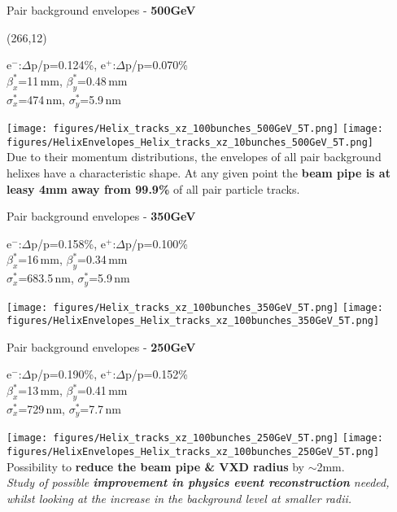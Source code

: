 \documentclass[xcolor={dvipsnames}]{beamer}
\newcommand{\proceedigHelix}{
  \setlength{\TPHorizModule}{1pt}
  \setlength{\TPVertModule}{1pt}
  \begin{textblock}{55}(266,12)
  \centering
  \textblockcolour{SpringGreen}
  \vspace*{0.8mm}{arXiv:\\1703.05737}\vspace*{0.8mm}
  \end{textblock}
}
\newcommand{\electron}{e$^-$}
\newcommand{\positron}{e$^+$}
\begin{document}
\begin{frame}{Pair background envelopes - \textbf{500GeV}}
\proceedigHelix
\begin{center}
\small
\electron:$\Delta$p/p=0.124\%, \positron:$\Delta$p/p=0.070\%\\
$\beta^*_x$=11\,mm, $\beta^*_y$=0.48\,mm\\
$\sigma^*_x$=474\,nm, $\sigma^*_y$=5.9\,nm
\end{center}
\texttt{[image: figures/Helix\_tracks\_xz\_100bunches\_500GeV\_5T.png]}\hspace*{0.1cm}
   \texttt{[image: figures/HelixEnvelopes\_Helix\_tracks\_xz\_10bunches\_500GeV\_5T.png]}\\
Due to their momentum distributions, the envelopes of all pair background helixes have a characteristic shape.
At any given point the \textbf{beam pipe is at leasy 4mm away from 99.9\%} of all pair particle tracks.
\end{frame}
\begin{frame}{Pair background envelopes - \textbf{350GeV}}
\begin{center}
\small
\electron:$\Delta$p/p=0.158\%, \positron:$\Delta$p/p=0.100\%\\
$\beta^*_x$=16\,mm, $\beta^*_y$=0.34\,mm\\
$\sigma^*_x$=683.5\,nm, $\sigma^*_y$=5.9\,nm
\end{center}
   \texttt{[image: figures/Helix\_tracks\_xz\_100bunches\_350GeV\_5T.png]}\hspace*{0.1cm}
   \texttt{[image: figures/HelixEnvelopes\_Helix\_tracks\_xz\_100bunches\_350GeV\_5T.png]}\\
\end{frame}
\begin{frame}{Pair background envelopes - \textbf{250GeV}}
\begin{center}
\small
\electron:$\Delta$p/p=0.190\%, \positron:$\Delta$p/p=0.152\%\\
$\beta^*_x$=13\,mm, $\beta^*_y$=0.41\,mm\\
$\sigma^*_x$=729\,nm, $\sigma^*_y$=7.7\,nm
\end{center}
   \texttt{[image: figures/Helix\_tracks\_xz\_100bunches\_250GeV\_5T.png]}\hspace*{0.1cm}
   \texttt{[image: figures/HelixEnvelopes\_Helix\_tracks\_xz\_100bunches\_250GeV\_5T.png]}\\
Possibility to \textbf{reduce the beam pipe \& VXD radius} by $\sim$2mm.\\
\textit{Study of possible \textbf{improvement in physics event reconstruction} needed, whilst looking at the increase in the background level at smaller radii.}
\end{frame}
\end{document}
